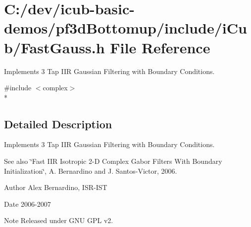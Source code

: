 \section{C\+:/dev/icub-\/basic-\/demos/pf3d\+Bottomup/include/i\+Cub/\+Fast\+Gauss.h File Reference}
\label{FastGauss_8h}


Implements 3 Tap I\+IR Gaussian Filtering with Boundary Conditions.  


{\ttfamily \#include $<$complex$>$}\\*


\subsection{Detailed Description}
Implements 3 Tap I\+IR Gaussian Filtering with Boundary Conditions. 

\begin{DoxySeeAlso}{See also}
\char`\"{}\+Fast I\+I\+R Isotropic 2-\/\+D Complex Gabor Filters With Boundary Initialization\char`\"{}, A. Bernardino and J. Santos-\/\+Victor, 2006. 
\end{DoxySeeAlso}
\begin{DoxyAuthor}{Author}
Alex Bernardino, I\+S\+R-\/\+I\+ST 
\end{DoxyAuthor}
\begin{DoxyDate}{Date}
2006-\/2007 
\end{DoxyDate}
\begin{DoxyNote}{Note}
Released under G\+NU G\+PL v2. 
\end{DoxyNote}
